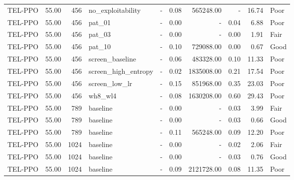 \begin{table}[htbp]
\begin{tabular}{lrrlrrrrrl}
TEL-PPO & 55.00 & 456 & no_exploitability & - & 0.08 & 565248.00 & - & 16.74 & Poor \\
TEL-PPO & 55.00 & 456 & pat_01 & - & 0.00 & - & 0.04 & 6.88 & Poor \\
TEL-PPO & 55.00 & 456 & pat_03 & - & 0.00 & - & 0.00 & 1.91 & Fair \\
TEL-PPO & 55.00 & 456 & pat_10 & - & 0.10 & 729088.00 & 0.00 & 0.67 & Good \\
TEL-PPO & 55.00 & 456 & screen_baseline & - & 0.06 & 483328.00 & 0.10 & 11.33 & Poor \\
TEL-PPO & 55.00 & 456 & screen_high_entropy & - & 0.02 & 1835008.00 & 0.21 & 17.54 & Poor \\
TEL-PPO & 55.00 & 456 & screen_low_lr & - & 0.15 & 851968.00 & 0.35 & 23.03 & Poor \\
TEL-PPO & 55.00 & 456 & wh8_wl4 & - & 0.08 & 1630208.00 & 0.60 & 29.43 & Poor \\
TEL-PPO & 55.00 & 789 & baseline & - & 0.00 & - & 0.03 & 3.99 & Fair \\
TEL-PPO & 55.00 & 789 & baseline & - & 0.00 & - & 0.03 & 0.66 & Good \\
TEL-PPO & 55.00 & 789 & baseline & - & 0.11 & 565248.00 & 0.09 & 12.20 & Poor \\
TEL-PPO & 55.00 & 1024 & baseline & - & 0.00 & - & 0.02 & 2.06 & Fair \\
TEL-PPO & 55.00 & 1024 & baseline & - & 0.00 & - & 0.03 & 0.76 & Good \\
TEL-PPO & 55.00 & 1024 & baseline & - & 0.09 & 2121728.00 & 0.08 & 11.35 & Poor \\
\bottomrule
\end{tabular}

\end{table}
